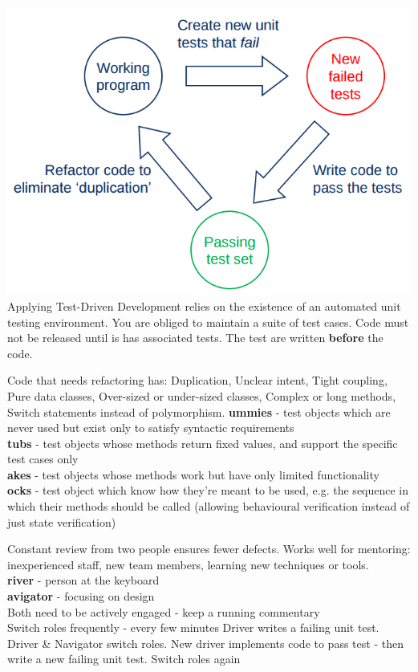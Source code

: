 \documentclass[number]{assignment}
\begin{document}
\begin{landscape}
\begin{multicols}{3}
\begin{multicols}{2}
\includegraphics[width=\linewidth]{Cycle.png}
\small Applying Test-Driven Development relies on the existence of an automated unit testing environment. You are obliged to maintain a suite of test cases. Code must not be released until is has associated tests. The test are written \textbf{before} the code.
\end{multicols}
\small Code that needs refactoring has: Duplication, Unclear intent, Tight coupling, Pure data classes, Over-sized or under-sized classes, Complex or long methods, Switch statements instead of polymorphism.
\small\textbf{ummies} - test objects which are never used but exist only to satisfy syntactic requirements\\
\small\textbf{tubs} - test objects whose methods return fixed values, and support the specific test cases only\\
\small\textbf{akes} - test objects whose methods work but have only limited functionality\\
\small\textbf{ocks} - test object which know how they're meant to be used, e.g. the sequence in which their methods should be called (allowing behavioural verification instead of just state verification)

\small Constant review from two people ensures fewer defects. Works well for mentoring: inexperienced staff, new team members, learning new techniques or tools.\\
\small\textbf{river} - person at the keyboard\\
\small\textbf{avigator} - focusing on design\\
\small Both need to be actively engaged - keep a running commentary\\
\small Switch roles frequently - every few minutes
\small Driver writes a failing unit test. Driver \& Navigator switch roles. New driver implements code to pass test - then write a new failing unit test. Switch roles again


\end{multicols}
\end{landscape}
\end{document}
